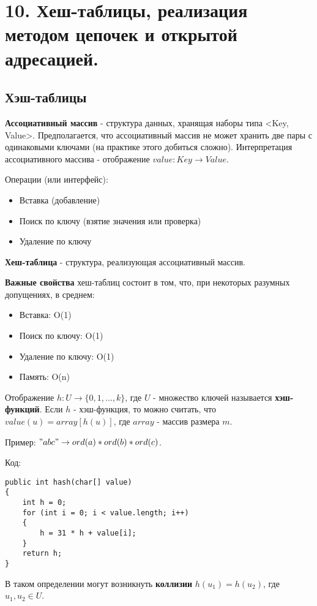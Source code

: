\section*{10. Хеш-таблицы, реализация методом цепочек и открытой адресацией.}

\subsection*{Хэш-таблицы}

{\bf Ассоциативный массив} - структура данных, хранящая наборы типа <Key, Value>. 
Предполагается, что ассоциативный массив не может хранить две пары с одинаковыми ключами (на практике этого добиться сложно).
Интерпретация ассоциативного массива - отображение $value: Key \rightarrow Value$.

Операции (или интерфейс):
\begin{itemize}
\item Вставка (добавление)
\item Поиск по ключу (взятие значения или проверка)
\item Удаление по ключу
\end{itemize}

{\bf Хеш-таблица} - структура, реализующая ассоциативный массив.

{\bf Важные свойства} хеш-таблиц состоит в том, что, при некоторых разумных допущениях, в среднем:
\begin{itemize}
\item Вставка: O(1)
\item Поиск по ключу: O(1)
\item Удаление по ключу: O(1)
\item Память: O(n)
\end{itemize}

Отображение $h: U \rightarrow \{0, 1, ..., k\}$, где $U$ - множество ключей называется {\bf хэш-функций}.
Если $h$ - хэш-функция, то можно считать, что $value(u) = array[h(u)]$, где $array$ - массив размера $m$.

Пример:
$"abc" \rightarrow ord(a)*ord(b)*ord(c)$.

Код:
\begin{verbatim}
public int hash(char[] value) 
{
	int h = 0;
	for (int i = 0; i < value.length; i++) 
	{
		h = 31 * h + value[i];
	}
	return h;
}
\end{verbatim}

В таком определении могут возникнуть {\bf коллизии} $h(u_1) = h(u_2)$, где $u_1, u_2 \in U$.

